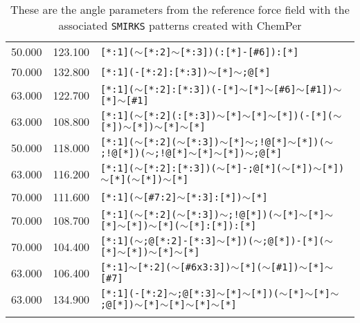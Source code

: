 \begin{longtable}{>{\baselineskip=10pt}p{} >{\baselineskip=10pt}p{} >{\baselineskip=10pt}p{}}
50.000 & 123.100 & \texttt{[*:1]($\sim$[*:2]$\sim$[*:3])(:[*]-[\#6]):[*]} \\ 
70.000 & 132.800 & \texttt{[*:1](-[*:2]:[*:3])$\sim$[*]$\sim$;@[*]} \\ 
63.000 & 122.700 & \texttt{[*:1]($\sim$[*:2]:[*:3])(-[*]$\sim$[*]$\sim$[\#6]$\sim$[\#1])$\sim$[*]$\sim$[\#1]} \\ 
63.000 & 108.800 & \texttt{[*:1]($\sim$[*:2](:[*:3])$\sim$[*]$\sim$[*]$\sim$[*])(-[*]($\sim$[*])$\sim$[*])$\sim$[*]$\sim$[*]} \\ 
50.000 & 118.000 & \texttt{[*:1]($\sim$[*:2]($\sim$[*:3])$\sim$[*]$\sim$;!@[*]$\sim$[*])($\sim$;!@[*])($\sim$;!@[*]$\sim$[*]$\sim$[*])$\sim$;@[*]} \\ 
63.000 & 116.200 & \texttt{[*:1]($\sim$[*:2]:[*:3])($\sim$[*]-;@[*]($\sim$[*])$\sim$[*])$\sim$[*]($\sim$[*])$\sim$[*]} \\ 
70.000 & 111.600 & \texttt{[*:1]($\sim$[\#7:2]$\sim$[*:3]:[*])$\sim$[*]} \\ 
70.000 & 108.700 & \texttt{[*:1]($\sim$[*:2]($\sim$[*:3])$\sim$;!@[*])($\sim$[*]$\sim$[*]$\sim$[*]$\sim$[*])$\sim$[*]($\sim$[*]:[*]):[*]} \\ 
70.000 & 104.400 & \texttt{[*:1]($\sim$;@[*:2]-[*:3]$\sim$[*])($\sim$;@[*])-[*]($\sim$[*]$\sim$[*])$\sim$[*]$\sim$[*]} \\ 
63.000 & 106.400 & \texttt{[*:1]$\sim$[*:2]($\sim$[\#6x3:3])$\sim$[*]($\sim$[\#1])$\sim$[*]$\sim$[\#7]} \\ 
63.000 & 134.900 & \texttt{[*:1](-[*:2]$\sim$;@[*:3]$\sim$[*]$\sim$[*])($\sim$[*]$\sim$[*]$\sim$;@[*])$\sim$[*]$\sim$[*]$\sim$[*]$\sim$[*]} \\ 
\hline\caption{These are the angle parameters from the reference force field with the associated \texttt{SMIRKS} patterns created with ChemPer} 
\label{tab:protein_angle}
\end{longtable}


